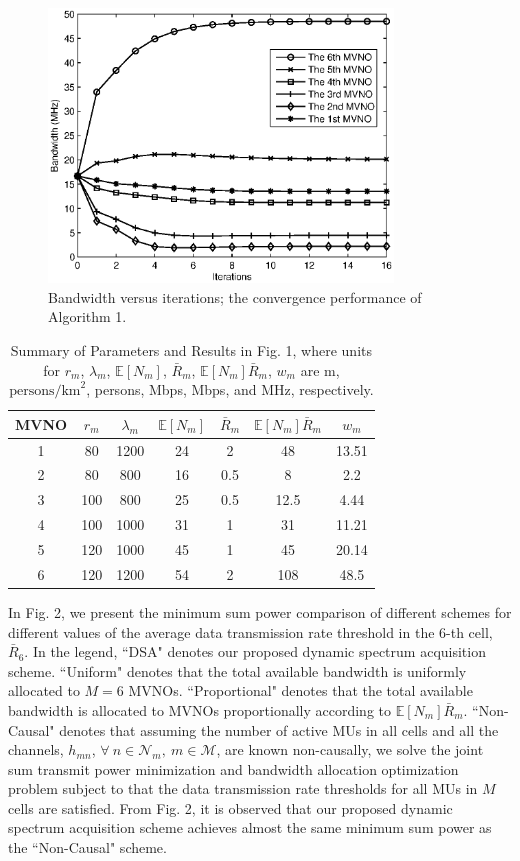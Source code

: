 \documentclass[journal]{IEEEtran}
\begin{document}
\begin{figure}
\centering
\includegraphics[width=3.6in]{fig1.eps}
\caption{Bandwidth versus iterations; the convergence performance of Algorithm 1.}
\end{figure}

{\begin{table}[!ht]
\color{red}
\caption{Summary of Parameters and Results in Fig. 1, where units for $r_m$, $\lambda_m$, $\mathbb{E}[N_m]$, $\bar{R}_m$, $\mathbb{E}[N_m]\bar{R}_m$, $w_m$ are m, $\mbox{persons/km}^2$, persons, Mbps, Mbps, and MHz, respectively.}
\centering
\begin{tabular}{|c|c|c|c|c|c|c|}
\hline
MVNO & $r_m $ & $\lambda_m$ & $\mathbb{E}[N_m]$	& $\bar{R}_m$ &  $\mathbb{E}[N_m]\bar{R}_m$ & $w_m$ \\
\hline
\hline
1&	80&  1200&  24&  2&  48&  13.51\\
	\hline
2&	80&  800&  16&  0.5&  8&  2.2\\
	\hline
3&	100&  800&  25&  0.5&  12.5&  4.44\\
	\hline
4&	100&  1000&  31&  1&  31&  11.21\\
	\hline
5&	120&  1000&  45&  1&  45&  20.14\\
	\hline
6&	120&  1200&  54&  2&  108&  48.5\\
	\hline
\end{tabular}
\label{t1}
\end{table}}

In Fig. 2, we present the minimum sum power comparison of different schemes for different values of the average data transmission rate threshold in the 6-th cell, $\bar{R}_6$. In the legend, ``DSA" denotes our proposed dynamic spectrum acquisition scheme. ``Uniform" denotes that the total available bandwidth is uniformly allocated to $M=6$ MVNOs. ``Proportional" denotes that the total available bandwidth is allocated to MVNOs proportionally according to $\mathbb{E}[N_m]\bar{R}_m$. ``Non-Causal" denotes that assuming the number of active MUs in all cells and all the channels, $h_{mn}$, $\forall\ n\in\mathcal{N}_m,\ m\in\mathcal{M}$, are known non-causally, we solve the joint sum transmit power minimization and bandwidth allocation optimization problem subject to that the data transmission rate thresholds for all MUs in $M$ cells are satisfied. From Fig. 2, it is observed that our proposed dynamic spectrum acquisition scheme achieves almost the same minimum sum power as the ``Non-Causal" scheme.
\end{document}
